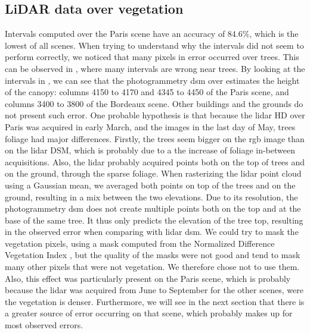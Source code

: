 \subsection{LiDAR data over vegetation}\label{eq:lidar_vegetation}
Intervals computed over the Paris scene have an accuracy of $84.6\%$, which is the lowest of all scenes. When trying to understand why the intervals did not seem to perform correctly, we noticed that many pixels in error occurred over trees. This can be observed in , where many intervals are wrong near trees. By looking at the intervals in , we can see that the photogrammetry \acrshort{dsm} over estimates the height of the canopy: columns 4150 to 4170 and 4345 to 4450 of the Paris scene, and columns 3400 to 3800 of the Bordeaux scene. Other buildings and the grounds do not present such error. One probable hypothesis is that because the \acrshort{lidar} HD over Paris was acquired in early March, and the images in the last day of May, trees foliage had major differences. Firstly, the trees seem bigger on the \acrshort{rgb} image than on the \acrshort{lidar} DSM, which is probably due to a the increase of foliage in-between acquisitions. Also, the \acrshort{lidar} probably acquired points both on the top of trees and on the ground, through the sparse foliage. When rasterizing the \acrshort{lidar} point cloud using a Gaussian mean, we averaged both points on top of the trees and on the ground, resulting in a mix between the two elevations. Due to its resolution, the photogrammetry \acrshort{dsm} does not create multiple points both on the top and at the base of the same tree. It thus only predicts the elevation of the tree top, resulting in the observed error when comparing with \acrshort{lidar} \acrshort{dsm}. We could try to mask the vegetation pixels, using a mask computed from the Normalized Difference Vegetation Index \cite{gao_ndwinormalized_1996}, but the quality of the masks were not good and tend to mask many other pixels that were not vegetation. We therefore chose not to use them. Also, this effect was particularly present on the Paris scene, which is probably because the \acrshort{lidar} was acquired from June to September for the other scenes, were the vegetation is denser. Furthermore, we will see in the next section that there is a greater source of error occurring on that scene, which probably makes up for most observed errors. 

